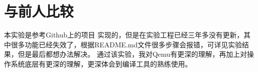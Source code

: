 \section{与前人比较}
本实验是参考Github上的项目 \cite{BusyBear} 实现的，但是在实验工程已经三年多没有更新，其中很多功能已经失效了，根据README.md文件很多步骤会报错，可详见实验结果\cite{结果演示}，但是最后都想办法解决。
通过该实验，我对Qemu有更深的理解，再加上对操作系统底层有更深的理解，更深体会到编译工具的熟练使用。



